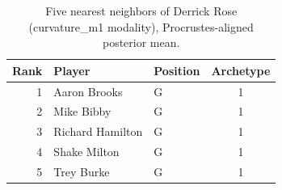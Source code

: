 \begin{table}[htbp]
  \centering\small
  \begin{tabular}{rllc}
    \toprule
    Rank & Player & Position & Archetype \\
    \midrule
    1 & Aaron Brooks & G & 1 \\
    2 & Mike Bibby & G & 1 \\
    3 & Richard Hamilton & G & 1 \\
    4 & Shake Milton & G & 1 \\
    5 & Trey Burke & G & 1 \\
    \bottomrule
  \end{tabular}
  \caption{Five nearest neighbors of Derrick Rose (curvature_m1 modality), Procrustes-aligned posterior mean.}
  \label{tab:Derrick_Rose_neighbors_curvature_m1}
\end{table}


